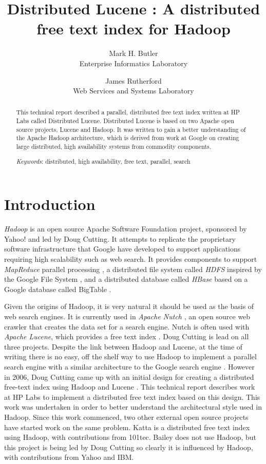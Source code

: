 \documentclass[a4paper,10pt]{article}
\title{Distributed Lucene : A distributed free text index for Hadoop}
\author{Mark H. Butler\\ \small Enterprise Informatics Laboratory \and James Rutherford \\ \small Web Services and Systems Laboratory}
\newcommand{\Keywords}[1]{\par\addvspace\baselineskip\noindent
{\small{\em Keywords\/}: #1}}
\begin{document}
\maketitle

\begin{abstract}
This technical report described a parallel, distributed free text index written at HP Labs called Distributed Lucene. Distributed Lucene is based on two Apache open source projects, Lucene and Hadoop. It was written to gain a better understanding of the Apache Hadoop architecture, which is derived from work at Google on creating large distributed, high availability systems from commodity components. 
\Keywords{distributed, high availability, free text, parallel, search}
\end{abstract}

\section{Introduction}
\emph{Hadoop} is an open source Apache Software Foundation project, sponsored by Yahoo!\cite{hadoop} and led by Doug Cutting. It attempts to replicate the proprietary software infrastructure that Google have developed to support applications requiring high scalability such as web search. It provides components to support \emph{MapReduce} parallel processing \cite{citeulike:430834}, a distributed file system called \emph{HDFS} inspired by the Google File System \cite{citeulike:300020}, and a distributed database called \emph{HBase} based on a Google database called BigTable \cite{citeulike:2259592}. 

Given the origins of Hadoop, it is very natural it should be used as the basis of web search engines. It is currently used in \emph{Apache Nutch} \cite{nutch}, an open source web crawler that creates the data set for a search engine. Nutch is often used with \emph{Apache Lucene}, which provides a free text index \cite{lucene}. Doug Cutting is lead on all three projects. Despite the link between Hadoop and Lucene, at the time of writing there is no easy, off the shelf way to use Hadoop to implement a parallel search engine with a similar architecture to the Google search engine \cite{barroso2003}. However in 2006, Doug Cutting came up with an initial design for creating a distributed free-text index using Hadoop and Lucene \cite{cutting2006}. This technical report describes work at HP Labs to implement a distributed free text index based on this design. This work was undertaken in order to better understand the architectural style used in Hadoop. Since this work commenced, two other external open source projects have started work on the same problem. Katta \cite{katta} is a distributed free text index using Hadoop, with contributions from 101tec. Bailey \cite{bailey} does not use Hadoop, but this project is being led by Doug Cutting so clearly it is influenced by Hadoop, with contributions from Yahoo and IBM. 
\end{document}
